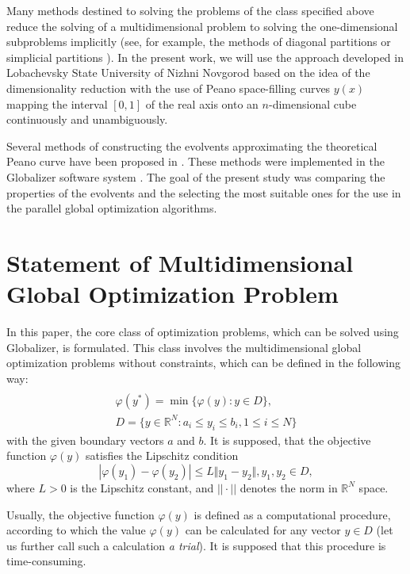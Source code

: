\documentclass[procedia]{easychair}
\begin{document}
Many methods destined to solving the problems of the class specified above reduce the solving
of a multidimensional problem to solving the one-dimensional subproblems implicitly (see, for
example, the methods of diagonal partitions \cite{Sergeyev2006,SergeyevKvasov2015} or
simplicial partitions \cite{Zilinskas2008,Zilinskas2014}). In the present work, we will use the
approach developed in Lobachevsky State University of Nizhni Novgorod based on the idea of
the dimensionality reduction with the use of Peano space-filling curves $y(x)$ mapping the
interval $[0,1]$ of the real axis onto an $n$-dimensional cube continuously and unambiguously.

Several methods of constructing the evolvents approximating the theoretical Peano curve have
been proposed in \cite{strongin1978,Strongin1992,Goryachih2017,Gergel2009}. These
methods were implemented in the Globalizer software system \cite{globalizerSystem}. The goal
of the present study was comparing the properties of the evolvents and the selecting the most
suitable ones for the use in the parallel global optimization algorithms.

\section{Statement of Multidimensional Global Optimization Problem}
In this paper, the core class of optimization problems, which can be solved using
Globalizer, is formulated. This class involves the multidimensional global
optimization problems without constraints, which can be defined in the following way:
\begin{equation}
\label{eq:task}
\begin{array}{cr}\\
  \varphi(y^*)=\min\{\varphi(y):y\in D\}, \\
  D=\{y\in \mathbb{R}^N:a_i\leq y_i\leq{b_i}, 1\leq{i}\leq{N}\}
\end{array}
\end{equation}
with the given boundary vectors  $a$ and  $b$. It is supposed, that the objective function
\(\varphi(y)\) satisfies the Lipschitz condition
\begin{equation}
\label{eq:lip}
|\varphi(y_1)-\varphi(y_2)|\leq L\Vert y_1-y_2\Vert,y_1,y_2\in D,
\end{equation}
where \(L>0\) is the Lipschitz constant, and \(||\cdot||\) denotes the norm in \(\mathbb{R}^N\)
space.
\par
Usually, the objective function \(\varphi(y)\) is defined as a computational procedure,
according to which the value \(\varphi(y)\) can be calculated for any vector \(y\in D\)
(let us further call such a calculation \textit{a trial}). It is supposed that this procedure
is time-consuming.
\end{document}
